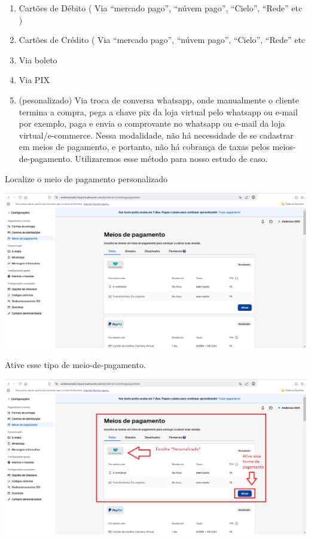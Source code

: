 \documentclass[
]{book}
\begin{document}
\begin{enumerate}
\def\labelenumi{\arabic{enumi}.}
\item
  Cartões de Débito ( Via ``mercado pago'', ``núvem pago'', ``Cielo'', ``Rede'' etc )
\item
  Cartões de Crédito ( Via ``mercado pago'', ``núvem pago'', ``Cielo'', ``Rede'' etc
\item
  Via boleto
\item
  Via PIX
\item
  (pesonalizado) Via troca de conversa whatsapp, onde manualmente o cliente termina a compra, pega a chave pix da loja virtual pelo whatsapp ou e-mail por exemplo, paga e envia o comprovante no whatsapp ou e-mail da loja virtual/e-commerce. Nessa modalidade, não há necessidade de se cadastrar em meios de pagamento, e portanto, não há cobrança de taxas pelos meios-de-pagamento. Utilizaremos esse método para nosso estudo de caso.
\end{enumerate}

Localize o meio de pagamento personalizado

\includegraphics{images/np1/092-loja_virtual_meio_de_pagamento3.jpg}

Ative esse tipo de meio-de-pagamento.

\includegraphics{images/np1/093-loja_virtual_meio_de_pagamento_personalizado.jpg}
\end{document}
